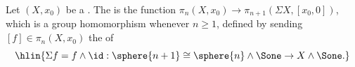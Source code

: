 \begin{definition} \label{definition:suspension_homomorphism_of_a_homotopy_group_of_a_pointed_topological_space}
    Let $(X,x_0)$ be a . 
    The  is the function $\pi_n(X,x_0) \to \pi_{n+1}(\Sigma X, [x_0, 0])$, which is a group homomorphism whenever $n \geq 1$, defined by sending $[f] \in \pi_n(X,x_0)$ the  of 
    $$\hlin{\Sigma f = f \wedge \id: \sphere{n+1} \cong \sphere{n} \wedge \Sone \to X \wedge \Sone.}$$
\end{definition}